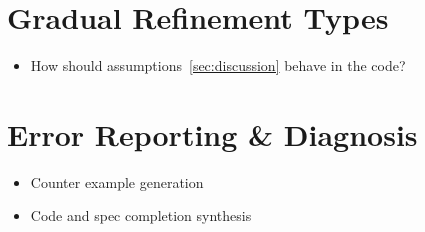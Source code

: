 \section{Gradual Refinement Types}\label{future:gradua}
\begin{itemize}
\item How should assumptions~\ref{sec:discussion} behave in the code? 
\end{itemize}


\section{Error Reporting \& Diagnosis}\label{future:errorreporting}
\begin{itemize}
\item Counter example generation 
\item Code and spec completion synthesis
\end{itemize}